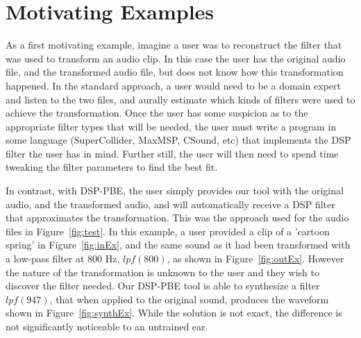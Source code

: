 \section{Motivating Examples}

As a first motivating example, imagine a user was to reconstruct the filter that was used to transform an audio clip.
In this case the user has the original audio file, and the transformed audio file, but does not know how this transformation happened.
In the standard approach, a user would need to be a domain expert and listen to the two files, and aurally estimate which kinds of filters were used to achieve the transformation.
Once the user has some suspicion as to the appropriate filter types that will be needed, the user must write a program in some language (SuperCollider, MaxMSP, CSound, etc) that implements the DSP filter the user has in mind.
Further still, the user will then need to spend time tweaking the filter parameters to find the best fit.

In contrast, with DSP-PBE, the user simply provides our tool with the original audio, and the transformed audio, and will automatically receive a DSP filter that approximates the transformation.
This was the approach used for the audio files in Figure~\ref{fig:test}.
In this example, a user provided a clip of a 'cartoon spring' in Figure~\ref{fig:inEx}, and the same sound as it had been transformed with a low-pass filter at 800 Hz, $lpf(800)$, as shown in Figure~\ref{fig:outEx}.
However the nature of the transformation is unknown to the user and they wish to discover the filter needed.
Our DSP-PBE tool is able to synthesize a filter $lpf(947)$, that when applied to the original sound, produces the waveform shown in Figure~\ref{fig:synthEx}.
While the solution is not exact, the difference is not significantly noticeable to an untrained ear.

